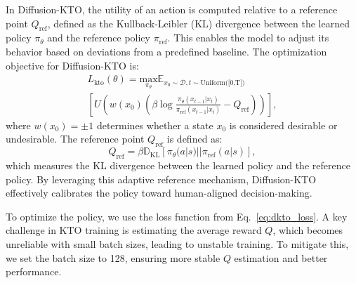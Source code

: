 In Diffusion-KTO, the utility of an action is computed relative to a reference point $Q_{\text{ref}}$, defined as the Kullback-Leibler (KL) divergence between the learned policy $\pi_{\theta}$ and the reference policy $\pi_{\text{ref}}$. This enables the model to adjust its behavior based on deviations from a predefined baseline. The optimization objective for Diffusion-KTO is:
\small
\begin{multline}
    L_{\text{kto}}(\theta)
    = \underset{\pi_{\theta}}{\text{max}}\mathbb{E}_{x_0 \sim \mathcal{D},t\sim \text{Uniform([0,T])} 
    } \\
    [U(w(x_0)(\beta \log \frac{\pi_\theta(x_{t-1}|x_t)}{\pi_{\text{ref}}(x_{t-1}|x_t)}-Q_{\text{ref}}))],
    \label{eq:dkto_loss}
\end{multline}
\normalsize
where $w(x_0) = \pm1$ determines whether a state $x_0$ is considered desirable or undesirable. The reference point $Q_{\text{ref}}$ is defined as:
\small
\begin{equation}
Q_{\text{ref}} = \beta \mathbb{D}_{\text{KL}}[\pi_{\theta}(a|s) ||\pi_{\text{ref}}(a|s)],
\end{equation}
\normalsize
which measures the KL divergence between the learned policy and the reference policy. By leveraging this adaptive reference mechanism, Diffusion-KTO effectively calibrates the policy toward human-aligned decision-making.


To optimize the policy, we use the loss function from Eq.~\ref{eq:dkto_loss}. A key challenge in KTO training is estimating the average reward $Q$, which becomes unreliable with small batch sizes, leading to unstable training. To mitigate this, we set the batch size to 128, ensuring more stable $Q$ estimation and better performance.

